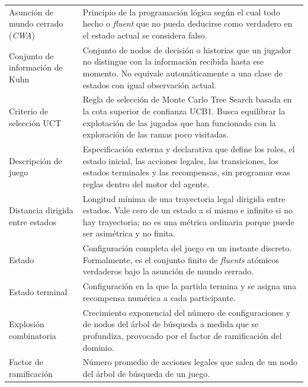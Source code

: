 \begin{longtable}[l]{
    @{}
    >{\raggedright\arraybackslash}p{4.2cm}
    p{\dimexpr\textwidth-4.2cm-2\tabcolsep\relax}
    @{}
    }
    Asunción de mundo cerrado (\textit{CWA})
                     &
    Principio de la programación lógica según el cual todo hecho o \textit{fluent} que no pueda deducirse como verdadero en el estado actual se considera falso.
    \\

    Conjunto de información de Kuhn
                     &
    Conjunto de nodos de decisión o historias que un jugador no distingue con la información recibida hasta ese momento. No equivale automáticamente a una clase de estados con igual observación actual.
    \\

    Criterio de selección UCT
                     &
    Regla de selección de Monte Carlo Tree Search basada en la cota superior de confianza UCB1. Busca equilibrar la explotación de las jugadas que han funcionado con la exploración de las ramas poco visitadas.
    \\

    Descripción de juego
                     &
    Especificación externa y declarativa que define los roles, el estado inicial, las acciones legales, las transiciones, los estados terminales y las recompensas, sin programar esas reglas dentro del motor del agente.
    \\

    Distancia dirigida entre estados
                     &
    Longitud mínima de una trayectoria legal dirigida entre estados. Vale cero de un estado a sí mismo e infinito si no hay trayectoria; no es una métrica ordinaria porque puede ser asimétrica y no finita.
    \\

    Estado
                     &
    Configuración completa del juego en un instante discreto. Formalmente, es el conjunto finito de \textit{fluents} atómicos verdaderos bajo la asunción de mundo cerrado.
    \\

    Estado terminal
                     &
    Configuración en la que la partida termina y se asigna una recompensa numérica a cada participante.
    \\

    Explosión combinatoria
                     &
    Crecimiento exponencial del número de configuraciones y de nodos del árbol de búsqueda a medida que se profundiza, provocado por el factor de ramificación del dominio.
    \\

    Factor de ramificación
                     &
    Número promedio de acciones legales que salen de un nodo del árbol de búsqueda de un juego.
    \\


\end{longtable}
